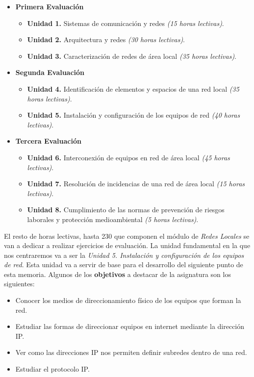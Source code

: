 \documentclass[spanish,12pt, a4paper,twoside]{paper}
\begin{document}
\begin{itemize}
\item \textbf{Primera Evaluación}
\begin{itemize}
\item \textbf{Unidad 1.} Sistemas de comunicación y redes \textit{(15 horas lectivas)}.
\item \textbf{Unidad 2.} Arquitectura y redes \textit{(30 horas lectivas)}.
\item \textbf{Unidad 3.} Caracterización de redes de área local \textit{(35 horas lectivas)}.
\end{itemize}
\item \textbf{Segunda Evaluación}
\begin{itemize}
\item \textbf{Unidad 4.} Identificación de elementos y espacios de una red local \textit{(35 horas lectivas)}.
\item \textbf{Unidad 5.} Instalación y configuración de los equipos de red \textit{(40 horas lectivas)}.
\end{itemize}
\item \textbf{Tercera Evaluación}
\begin{itemize}
\item \textbf{Unidad 6.} Interconexión de equipos en red de área local \textit{(45 horas lectivas)}.
\item \textbf{Unidad 7.} Resolución de incidencias de una red de área local \textit{(15 horas lectivas)}.
\item \textbf{Unidad 8.} Cumplimiento de las normas de prevención de riesgos laborales y protección medioambiental \textit{(5 horas lectivas)}.
\end{itemize}
\end{itemize}
\justify
El resto de horas lectivas, hasta 230 que componen el módulo de \textit{Redes Locales} se van a dedicar a realizar ejercicios de evaluación.
\justify
La unidad fundamental en la que nos centraremos va a ser la \textit{Unidad 5. Instalación y configuración de los equipos de red}. Esta unidad va a servir de base para el desarrollo del siguiente punto de esta memoria.
\justify
Algunos de los \textbf{objetivos} a destacar de la asignatura son los siguientes:
\begin{itemize}
\item Conocer los medios de direccionamiento físico de los equipos que forman la red.
\item Estudiar las formas de direccionar equipos en internet mediante la dirección IP.
\item Ver como las direcciones IP nos permiten definir subredes dentro de una red.
\item Estudiar el protocolo IP.
\end{itemize}
\end{document}
